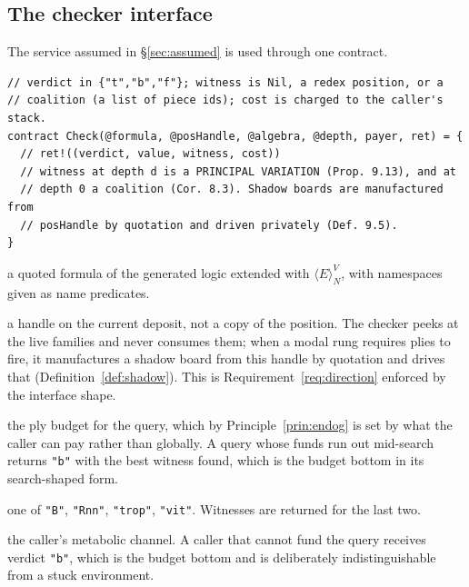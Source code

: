 \documentclass[11pt,a4paper]{article}
\theoremstyle{plain}
\theoremstyle{definition}
\theoremstyle{remark}
\newcommand{\Emod}[2]{\langle E\rangle^{#2}_{#1}}
\begin{document}
\subsection{The checker interface}
\label{sec:checker}

The service assumed in \S\ref{sec:assumed} is used through one contract.

\begin{lstlisting}
// verdict in {"t","b","f"}; witness is Nil, a redex position, or a
// coalition (a list of piece ids); cost is charged to the caller's stack.
contract Check(@formula, @posHandle, @algebra, @depth, payer, ret) = {
  // ret!((verdict, value, witness, cost))
  // witness at depth d is a PRINCIPAL VARIATION (Prop. 9.13), and at
  // depth 0 a coalition (Cor. 8.3). Shadow boards are manufactured from
  // posHandle by quotation and driven privately (Def. 9.5).
}
\end{lstlisting}

\begin{description}[leftmargin=1.6em,style=nextline]
\item[\texttt{formula}] a quoted formula of the generated logic extended with
$\Emod{N}{V}$, with namespaces given as name predicates.
\item[\texttt{posHandle}] a handle on the current deposit, not a copy of the
position. The checker peeks at the live families and never consumes them; when a
modal rung requires plies to fire, it manufactures a shadow board from this
handle by quotation and drives that (Definition~\ref{def:shadow}). This is
Requirement~\ref{req:direction} enforced by the interface shape.
\item[\texttt{depth}] the ply budget for the query, which by
Principle~\ref{prin:endog} is set by what the caller can pay rather than
globally. A query whose funds run out mid-search returns \texttt{"b"} with the
best witness found, which is the budget bottom in its search-shaped form.
\item[\texttt{algebra}] one of \texttt{"B"}, \texttt{"Rnn"}, \texttt{"trop"},
\texttt{"vit"}. Witnesses are returned for the last two.
\item[\texttt{payer}] the caller's metabolic channel. A caller that cannot fund
the query receives verdict \texttt{"b"}, which is the budget bottom and is
deliberately indistinguishable from a stuck environment.
\end{description}
\end{document}
